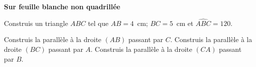 {\bf Sur feuille blanche non quadrillée}
\begin{myenumerate}
\item Construis un triangle $ABC$ tel que $AB=4$~cm; $BC=5$~cm et
$\widehat{ABC}=120$\degres.
\item Construis la parallèle à la droite $(AB)$ passant par
$C$. Construis la parallèle à la droite $(BC)$ passant par
$A$. Construis la parallèle à la droite $(CA)$ passant par $B$.
\end{myenumerate}